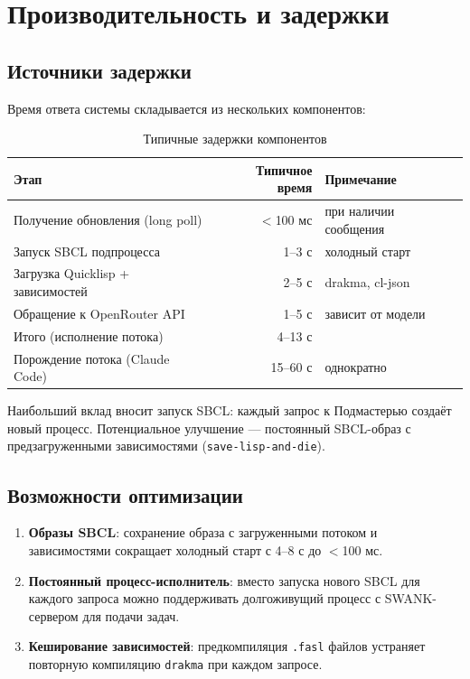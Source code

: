 \documentclass[11pt,a4paper]{article}
\begin{document}
\section{Производительность и задержки}

\subsection{Источники задержки}

Время ответа системы складывается из нескольких компонентов:

\begin{table}[H]
\centering
\begin{tabular}{lrp{5.5cm}}
\toprule
\textbf{Этап} & \textbf{Типичное время} & \textbf{Примечание} \\
\midrule
Получение обновления (long poll) & $<$100 мс & при наличии сообщения \\
Запуск SBCL подпроцесса           & 1--3 с    & холодный старт \\
Загрузка Quicklisp + зависимостей & 2--5 с    & drakma, cl-json \\
Обращение к OpenRouter API        & 1--5 с    & зависит от модели \\
Итого (исполнение потока)         & 4--13 с   & \\
\midrule
Порождение потока (Claude Code)   & 15--60 с  & однократно \\
\bottomrule
\end{tabular}
\caption{Типичные задержки компонентов}
\end{table}

Наибольший вклад вносит запуск SBCL: каждый запрос к Подмастерью
создаёт новый процесс. Потенциальное улучшение — постоянный SBCL-образ
с предзагруженными зависимостями (\texttt{save-lisp-and-die}).

\subsection{Возможности оптимизации}

\begin{enumerate}
  \item \textbf{Образы SBCL}: сохранение образа с загруженными потоком
    и зависимостями сокращает холодный старт с 4--8 с до $<$100 мс.

  \item \textbf{Постоянный процесс-исполнитель}: вместо запуска нового
    SBCL для каждого запроса можно поддерживать долгоживущий процесс
    с SWANK-сервером для подачи задач.

  \item \textbf{Кеширование зависимостей}: предкомпиляция \texttt{.fasl}
    файлов устраняет повторную компиляцию \texttt{drakma} при каждом запросе.
\end{enumerate}
\end{document}
